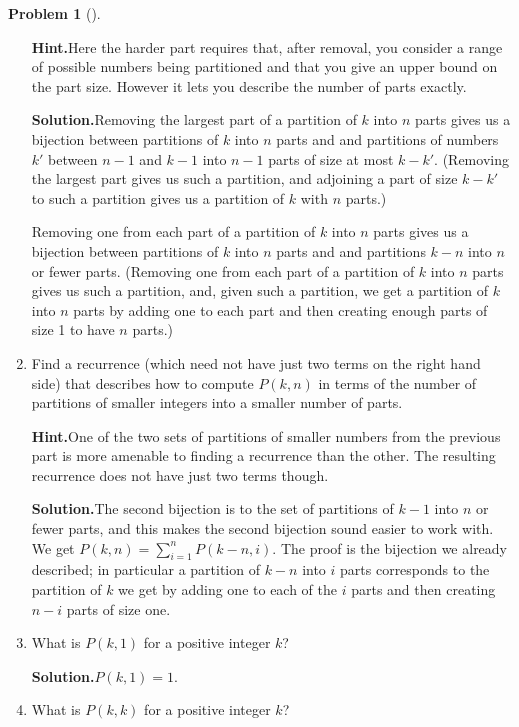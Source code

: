\documentclass[10pt,]{book}
\theoremstyle{plain}
\theoremstyle{definition}
\newtheorem{activity}[project]{Problem}
\theoremstyle{definition}
\numberwithin{equation}{chapter}
\begin{document}
\begin{activity}[]
\begin{enumerate}[font=\bfseries,label=(\alph*),ref=\alph*]
\par\medskip\noindent%
\textbf{Hint.}\quad Here the harder part requires that, after removal, you consider a range of possible numbers being partitioned and that you give an upper bound on the part size. However it lets you describe the number of parts exactly.%
\par\medskip\noindent%
\textbf{Solution.}\quad Removing the largest part of a partition of \(k\) into \(n\) parts gives us a bijection between partitions of \(k\) into \(n\) parts and and partitions of numbers \(k'\) between \(n-1\) and \(k-1\) into \(n-1\) parts of size at most \(k-k'\). (Removing the largest part gives us such a partition, and adjoining a part of size \(k-k'\) to such a partition gives us a partition of \(k\) with \(n\) parts.)%
\par
Removing one from each part of a partition of \(k\) into \(n\) parts gives us a bijection between partitions of \(k\) into \(n\) parts and and partitions \(k-n\) into \(n\) or fewer parts. (Removing one from each part of a partition of \(k\) into \(n\) parts gives us such a partition, and, given such a partition, we get a partition of \(k\) into \(n\) parts by adding one to each part and then creating enough parts of size 1 to have \(n\) parts.)%
\item\label{task-122} Find a recurrence (which need not have just two terms on the right hand side) that describes how to compute \(P(k,n)\) in terms of the number of partitions of smaller integers into a smaller number of parts.%
\par\medskip\noindent%
\textbf{Hint.}\quad One of the two sets of partitions of smaller numbers from the previous part is more amenable to finding a recurrence than the other. The resulting recurrence does not have just two terms though.%
\par\medskip\noindent%
\textbf{Solution.}\quad The second bijection is to the set of partitions of \(k-1\) into \(n\) or fewer parts, and this makes the second bijection sound easier to work with. We get \(P(k,n)=\sum_{i=1}^n P(k-n,i)\). The proof is the bijection we already described; in particular a partition of \(k-n\) into \(i\) parts corresponds to the partition of \(k\) we get by adding one to each of the \(i\) parts and then creating \(n-i\) parts of size one.%
\item\label{task-123} What is \(P(k,1)\) for a positive integer \(k\)?%
\par\medskip\noindent%
\textbf{Solution.}\quad \(P(k,1)=1\).%
\item\label{task-124} What is \(P(k,k)\) for a positive integer \(k\)?%

\end{enumerate}
\end{activity}
\end{document}
